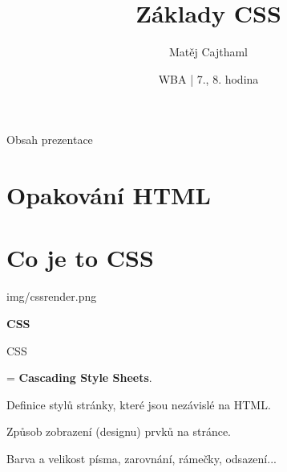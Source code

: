 \documentclass[aspectratio=1610]{beamer}
\title{Základy CSS}
\date{WBA | 7., 8. hodina}
\author[Cajthaml]{Matěj Cajthaml}
\begin{document}
\begin{frame}
\titlepage
\end{frame}

\begin{frame}{Obsah prezentace}
    \begin{cardTiny}
        \begin{minipage}{\textwidth}
            \vspace{1ex}
            \tableofcontents
        \end{minipage}
    \end{cardTiny}
\end{frame}

\section{Opakování HTML}


\section{Co je to CSS}

\begin{frameImg}[width]{img/cssrender.png}
    \vspace*{60mm}
    \begin{cardTiny}
        \vspace*{\fill}
        \begin{center}
            \textbf{CSS}
        \end{center}
    \end{cardTiny}
\end{frameImg}

\begin{frame}{CSS}
    \begin{cardTiny}
        \begin{flushleft}
            = \textbf{Cascading Style Sheets}.

            Definice stylů stránky, které jsou nezávislé na HTML.

            Způsob zobrazení (designu) prvků na stránce.

            \vspace{2ex}
            Barva a velikost písma, zarovnání, rámečky, odsazení...
        \end{flushleft}
    \end{cardTiny}
\end{frame}
\end{document}
